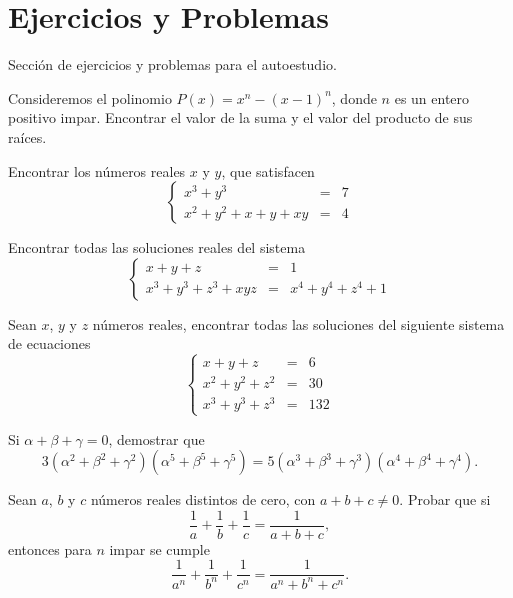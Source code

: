 \section{Ejercicios y Problemas}
{
    Sección de ejercicios y problemas para el autoestudio.

    \begin{section-problem}
        Consideremos el polinomio $P(x) = x^n - (x - 1)^n$, donde $n$ es un entero positivo impar.
        Encontrar el valor de la suma y el valor del producto de sus raíces.
    \end{section-problem}

    \begin{section-problem}
        Encontrar los números reales $x$ y $y$, que satisfacen
        \[
            \left\{
            \begin{array}{rcl}
                x^3 + y^3 & =& 7\\
                x^2 + y^2 + x + y + xy & =& 4
            \end{array}
            \right.
        \]
    \end{section-problem}

    \begin{section-problem}
        Encontrar todas las soluciones reales del sistema
        \[
            \left\{
            \begin{array}{rcl}
                x + y + z & =& 1\\
                x^3 + y^3 + z^3 + xyz & =& x^4 + y^4 + z^4 + 1
            \end{array}
            \right.
        \]
    \end{section-problem}

    \begin{section-problem}
        Sean $x$, $y$ y $z$ números reales, encontrar todas las soluciones del siguiente sistema de ecuaciones
        \[
            \left\{
            \begin{array}{rcl}
                x + y + z & =& 6\\
                x^2 + y^2 + z^2 & =& 30\\
                x^3 + y^3 + z^3 & =& 132
            \end{array}
            \right.
        \]
    \end{section-problem}

    \begin{section-problem}
        Si $\alpha + \beta + \gamma = 0$, demostrar que
        \[3 (\alpha^2 + \beta^2 + \gamma^2) (\alpha^5 + \beta^5 + \gamma^5) = 5 (\alpha^3 + \beta^3 + \gamma^3) (\alpha^4 + \beta^4 + \gamma^4).\]
    \end{section-problem}

    \begin{section-problem}
        Sean $a$, $b$ y $c$ números reales distintos de cero, con $a + b + c \neq 0$.
        Probar que si
        \[\frac{1}{a} + \frac{1}{b} + \frac{1}{c} = \frac{1}{a + b + c},\]
        entonces para $n$ impar se cumple
        \[\frac{1}{a^n} + \frac{1}{b^n} + \frac{1}{c^n} = \frac{1}{a^n + b^n + c^n}.\]
    \end{section-problem}

}